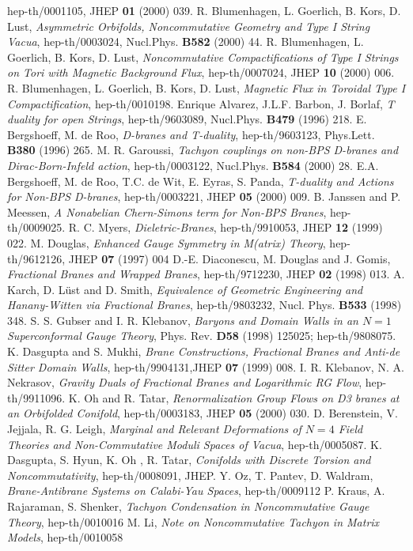 \documentclass[a4paper,12pt]{article}
\begin{document}
\begin{thebibliography}{99}
hep-th/0001105, JHEP {\bf 01} (2000) 039.
R. Blumenhagen, L. Goerlich, B. Kors, D. Lust, 
{\it Asymmetric Orbifolds, Noncommutative Geometry and Type I String Vacua},
 hep-th/0003024, Nucl.Phys. {\bf B582} (2000) 44.
 R. Blumenhagen, L. Goerlich, B. Kors, D. Lust,
{\it Noncommutative Compactifications of Type I Strings on Tori with 
Magnetic Background Flux}, hep-th/0007024, JHEP {\bf 10} (2000) 006.
R. Blumenhagen, L. Goerlich, B. Kors, D. Lust,
{\it  Magnetic Flux in Toroidal Type I Compactification}, hep-th/0010198.
 Enrique Alvarez, J.L.F. Barbon, J. Borlaf,
{\it T duality for open Strings}, hep-th/9603089, Nucl.Phys. {\bf B479}
 (1996) 218.   
 E. Bergshoeff, M. de Roo, {\it D-branes and T-duality},
hep-th/9603123, Phys.Lett. {\bf B380} (1996) 265.
 M. R. Garoussi, {\it Tachyon couplings on non-BPS 
D-branes and Dirac-Born-Infeld action}, hep-th/0003122,
Nucl.Phys. {\bf B584} (2000) 28.
 E.A. Bergshoeff, M. de Roo, T.C. de Wit, E. Eyras, S. Panda,
{\it T-duality and Actions for Non-BPS D-branes}, 
hep-th/0003221, JHEP {\bf 05} (2000) 009.
 B. Janssen and P. Meessen, {\it A Nonabelian Chern-Simons term
for Non-BPS Branes}, hep-th/0009025.
 R. C. Myers, {\it Dieletric-Branes}, hep-th/9910053,
JHEP {\bf 12} (1999) 022.
 M. Douglas, {\it Enhanced Gauge
Symmetry in M(atrix) Theory}, hep-th/9612126, JHEP {\bf 07} (1997) 004 
 D.-E. Diaconescu, M. Douglas and J. Gomis, {\it
Fractional Branes and 
Wrapped Branes}, hep-th/9712230, JHEP {\bf 02}
(1998) 013.
 A. Karch, D. L\"ust and D. Smith, {\it
Equivalence of Geometric Engineering and Hanany-Witten via Fractional
Branes},
hep-th/9803232, Nucl. Phys. {\bf B533} (1998) 348.
 S. S. Gubser and I. R. Klebanov, {\it Baryons and Domain
Walls in an $N =1$ Superconformal Gauge Theory},
Phys. Rev. {\bf D58} (1998) 125025; hep-th/9808075.
 K. Dasgupta and S. Mukhi, {\it Brane
Constructions, Fractional Branes and Anti-de Sitter Domain Walls},
hep-th/9904131,JHEP {\bf 07} (1999) 008.
 I. R. Klebanov, N. A. Nekrasov, {\it Gravity Duals of
Fractional Branes and Logarithmic RG Flow}, hep-th/9911096.
  K. Oh and R. Tatar, {\it Renormalization
Group Flows on D3 branes at an Orbifolded Conifold}, hep-th/0003183,
JHEP {\bf 05} (2000) 030.
 D. Berenstein, V. Jejjala, R. G. Leigh,
{\it  Marginal and Relevant Deformations of $N=4$ 
Field Theories and Non-Commutative Moduli Spaces of Vacua}, hep-th/0005087.
 K. Dasgupta, S. Hyun, K. Oh , R. Tatar,
{\it Conifolds with Discrete Torsion and Noncommutativity}, 
hep-th/0008091, JHEP.
  Y. Oz, T. Pantev, D. Waldram, 
{\it Brane-Antibrane Systems on Calabi-Yau Spaces}, hep-th/0009112 
P. Kraus, A. Rajaraman, S. Shenker, {\it Tachyon 
Condensation in Noncommutative Gauge Theory},  hep-th/0010016 
 M. Li, {\it Note on Noncommutative Tachyon in Matrix Models},
hep-th/0010058 
\end{thebibliography}
\end{document}
